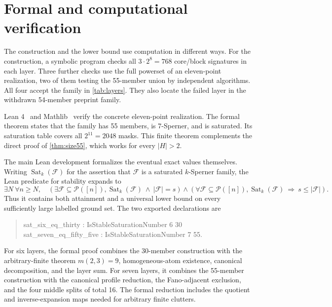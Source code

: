 \documentclass[a4paper,fleqn,longmktitle]{cas-sc}
\theoremstyle{definition}
\theoremstyle{remark}
\newcommand{\powerset}{\mathcal{P}}
\begin{document}
\section{Formal and computational verification}
\label{sec:verification}

The construction and the lower bound use computation in different ways.  For
the construction, a symbolic program checks all $3\cdot2^8=768$ core/block
signatures in each layer.  Three further checks use the full powerset of an
eleven-point realization, two of them testing the 55-member union by
independent algorithms.  All four accept the family in \cref{tab:layers}.
They also locate the failed layer in the withdrawn 54-member preprint family.

Lean 4~\cite{lean4} and Mathlib~\cite{mathlib2020} verify the concrete
eleven-point realization.  The formal theorem states that the family has 55
members, is 7-Sperner, and is saturated.  Its saturation table covers all
$2^{11}=2048$ masks.  This finite theorem complements the direct proof of
\cref{thm:size55}, which works for every $|H|>2$.

The main Lean development formalizes the eventual exact values themselves.
Writing $\operatorname{Sat}_k(\mathcal F)$ for the assertion that
$\mathcal F$ is a saturated $k$-Sperner family, the Lean predicate for
stability expands to
\[
  \exists N\ \forall n\geq N,\quad
  \left(\exists\mathcal F\subseteq\powerset([n]),
    \operatorname{Sat}_k(\mathcal F)\ \land\ |\mathcal F|=s\right)
  \land
  \left(\forall\mathcal F\subseteq\powerset([n]),
    \operatorname{Sat}_k(\mathcal F)\ \Longrightarrow\ s\leq|\mathcal F|\right).
\]
Thus it contains both attainment and a universal lower bound on every
sufficiently large labelled ground set.  The two exported declarations are
\begin{quote}\small\ttfamily
sat\_six\_eq\_thirty : IsStableSaturationNumber 6 30\\
sat\_seven\_eq\_fifty\_five : IsStableSaturationNumber 7 55.
\end{quote}

For six layers, the formal proof combines the 30-member construction with the
arbitrary-finite theorem $m(2,3)=9$, homogeneous-atom existence, canonical
decomposition, and the layer sum.  For seven layers, it combines the
55-member construction with the canonical profile reduction, the
Fano-adjacent exclusion, and the four middle splits of total 16.  The formal
reduction includes the quotient and inverse-expansion maps needed for
arbitrary finite clutters.
\end{document}

